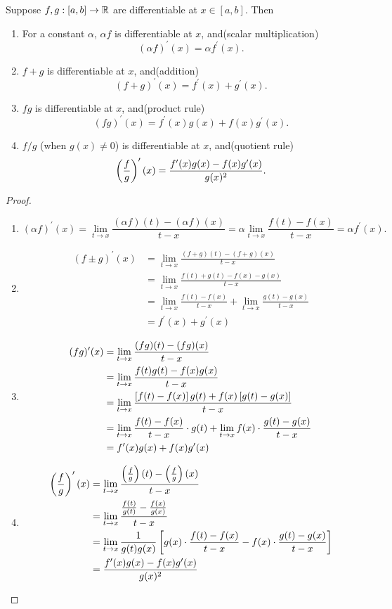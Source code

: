 \begin{lemma}
Suppose $f,g:[a,b]\to\mathbb R$ are differentiable at $x\in[a,b]$. Then
\begin{enumerate}[label=(\roman*)]
\item For a constant $\alpha$, $\alpha f$ is differentiable at $x$, and\hfill(scalar multiplication)
\[(\alpha f)^\prime(x)=\alpha f^\prime(x).\]
\item $f+g$ is differentiable at $x$, and\hfill(addition)
\[(f+g)^\prime(x)=f^\prime(x)+g^\prime(x).\]
\item $fg$ is differentiable at $x$, and\hfill(product rule)
\[(fg)^\prime(x)=f^\prime(x)g(x)+f(x)g^\prime(x).\]
\item $f/g$ (when $g(x)\neq0$) is differentiable at $x$, and\hfill(quotient rule)
\[\left(\frac{f}{g}\right)^\prime(x)=\frac{f^\prime(x)g(x)-f(x)g^\prime(x)}{g(x)^2}.\]
\end{enumerate}
\end{lemma}

\begin{proof} \
\begin{enumerate}[label=(\roman*)]
\item \[(\alpha f)^\prime(x)=\lim_{t\to x}\frac{(\alpha f)(t)-(\alpha f)(x)}{t-x}=\alpha\lim_{t\to x}\frac{f(t)-f(x)}{t-x}=\alpha f^\prime(x).\]
\item \begin{align*}
(f\pm g)^\prime(x)
&=\lim_{t\to x}\frac{(f+g)(t)-(f+g)(x)}{t-x}\\
&=\lim_{t\to x}\frac{f(t)+g(t)-f(x)-g(x)}{t-x}\\
&=\lim_{t\to x}\frac{f(t)-f(x)}{t-x}+\lim_{t\to x}\frac{g(t)-g(x)}{t-x}\\
&=f^\prime(x)+g^\prime(x)
\end{align*}

\item \begin{align*}
(fg)^\prime(x)
&=\lim_{t\to x}\frac{(fg)(t)-(fg)(x)}{t-x}\\
&=\lim_{t\to x}\frac{f(t)g(t)-f(x)g(x)}{t-x}\\
&=\lim_{t\to x}\frac{\left[f(t)-f(x)\right]g(t)+f(x)\left[g(t)-g(x)\right]}{t-x}\\
&=\lim_{t\to x}\frac{f(t)-f(x)}{t-x}\cdot g(t)+\lim_{t\to x}f(x)\cdot\frac{g(t)-g(x)}{t-x}\\
&=f^\prime(x)g(x)+f(x)g^\prime(x)
\end{align*}

\item \begin{align*}
\left(\frac{f}{g}\right)^\prime(x)
&=\lim_{t\to x}\frac{\left(\frac{f}{g}\right)(t)-\left(\frac{f}{g}\right)(x)}{t-x}\\
&=\lim_{t\to x}\frac{\frac{f(t)}{g(t)}-\frac{f(x)}{g(x)}}{t-x}\\
&=\lim_{t\to x}\frac{1}{g(t)g(x)}\left[g(x)\cdot\frac{f(t)-f(x)}{t-x}-f(x)\cdot\frac{g(t)-g(x)}{t-x}\right]\\
&=\frac{f^\prime(x)g(x)-f(x)g^\prime(x)}{g(x)^2}
\end{align*}
\end{enumerate}
\end{proof}

